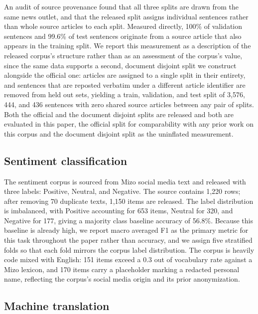 \documentclass[11pt,a4paper]{article}
\begin{document}
An audit of source provenance found that all three splits are drawn from the same news outlet, and that the released split assigns individual sentences rather than whole source articles to each split. Measured directly, 100\% of validation sentences and 99.6\% of test sentences originate from a source article that also appears in the training split. We report this measurement as a description of the released corpus's structure rather than as an assessment of the corpus's value, since the same data supports a second, document disjoint split we construct alongside the official one: articles are assigned to a single split in their entirety, and sentences that are reposted verbatim under a different article identifier are removed from held out sets, yielding a train, validation, and test split of 3,576, 444, and 436 sentences with zero shared source articles between any pair of splits. Both the official and the document disjoint splits are released and both are evaluated in this paper, the official split for comparability with any prior work on this corpus and the document disjoint split as the uninflated measurement.

\subsection{Sentiment classification}
\label{sec:sentiment-data}

The sentiment corpus is sourced from Mizo social media text and released with three labels: Positive, Neutral, and Negative. The source contains 1,220 rows; after removing 70 duplicate texts, 1,150 items are released. The label distribution is imbalanced, with Positive accounting for 653 items, Neutral for 320, and Negative for 177, giving a majority class baseline accuracy of 56.8\%. Because this baseline is already high, we report macro averaged F1 as the primary metric for this task throughout the paper rather than accuracy, and we assign five stratified folds so that each fold mirrors the corpus label distribution. The corpus is heavily code mixed with English: 151 items exceed a 0.3 out of vocabulary rate against a Mizo lexicon, and 170 items carry a placeholder marking a redacted personal name, reflecting the corpus's social media origin and its prior anonymization.

\subsection{Machine translation}
\label{sec:mt-data}
\end{document}
